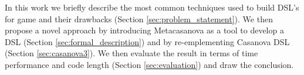 In this work we briefly describe the most common techniques used to build DSL's for game and their drawbacks (Section \ref{sec:problem_statement}). We then propose a novel approach by introducing Metacasanova as a tool to develop a DSL (Section \ref{sec:formal_description}) and by re-emplementing Casanova DSL (Section \ref{sec:casanova3}). We then evaluate the result in terms of time performance and code length (Section \ref{sec:evaluation}) and draw the conclusion.

\begin{comment}
In Section \ref{sec:problem_statement} we describe the most
common techniques to solve the concurrency problems in games. In
Section \ref{sec:formal_description} we propose a novel approach to
defining DSL's for games by using a metacompiler called Metacasanova.
We will motivate the role of Metacasanova in easing the process of building a compiler and explain the structure of a program in Metacasanova. In Section
\ref{sec:casanova3} we will present as case study Casanova 2.5, a
re-implementation of Casanova, a language oriented to video game
development, in the metacompiler. We choose this particular language
for its high-performance and usability in the scope of game
development \cite{CASANOVA2_PAPER}. In Section \ref{sec:evaluation} we
compare the running time of the generated code of Casanova 2.5 for a
sample with an analogous implementation in Python. Moreover we compare
the code length of the implementation of Casanova 2.5 in Metacasanova
with the implementation of the current Casanova hard-coded compiler.
In Section \ref{sec:future_works} we will present the conclusions about this work.
\end{comment}

